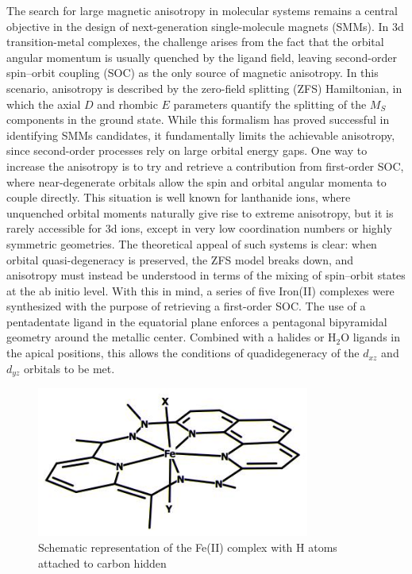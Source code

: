 \documentclass[10pt]{report}
\numberwithin{equation}{section}
\begin{document}
The search for large magnetic anisotropy in molecular systems remains a central objective in the design of next-generation single-molecule magnets (SMMs).
In 3d transition-metal complexes, the challenge arises from the fact that the orbital angular momentum is usually quenched by the ligand field, leaving second-order spin–orbit coupling (SOC) as the only source of magnetic anisotropy.
In this scenario, anisotropy is described by the zero-field splitting (ZFS) Hamiltonian, in which the axial $D$ and rhombic $E$ parameters quantify the splitting of the $M_S$ components in the ground state.
While this formalism has proved successful in identifying SMMs candidates, it fundamentally limits the achievable anisotropy, since second-order processes rely on large orbital energy gaps.
One way to increase the anisotropy is to try and retrieve a contribution from first-order SOC, where near-degenerate orbitals allow the spin and orbital angular momenta to couple directly.
This situation is well known for lanthanide ions, where unquenched orbital moments naturally give rise to extreme anisotropy, but it is rarely accessible for 3d ions, except in very low coordination numbers or highly symmetric geometries.
The theoretical appeal of such systems is clear: when orbital quasi-degeneracy is preserved, the ZFS model breaks down, and anisotropy must instead be understood in terms of the mixing of spin–orbit states at the ab initio level.
With this in mind, a series of five Iron(II) complexes were synthesized with the purpose of retrieving a first-order SOC.
The use of a pentadentate ligand in the equatorial plane enforces a pentagonal bipyramidal geometry around the metallic center. Combined with a halides or H$_2$O ligands in the apical positions, this allows the conditions of quadidegeneracy of the $d_{xz}$ and $d_{yz}$ orbitals to be met.

\begin{figure}[!ht]
    \centering
    \includegraphics[width=0.8\textwidth]{Images/ComplexFe.XY.jpg}
    \caption{Schematic representation of the Fe(II) complex with H atoms attached to carbon hidden}
    \label{FeComplex}
\end{figure}
\end{document}
